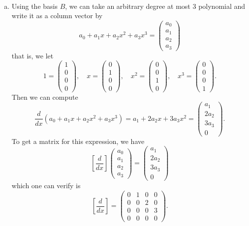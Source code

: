 \documentclass[12pt]{article} %
\begin{document}
\begin{solution}~
\begin{enumerate}[(a)]
\item Using the basis $B$, we can take an arbitrary degree at most 3 polynomial and write it as a column vector by
\[
a_0 + a_1 x + a_2x^2 + a_3x^3 = \begin{pmatrix} a_0 \\ a_1 \\ a_2 \\ a_3 \end{pmatrix}
\]
that is, we let
\[
1 = \begin{pmatrix} 1 \\ 0 \\ 0 \\ 0 \end{pmatrix},\quad x = \begin{pmatrix} 0 \\ 1 \\ 0 \\ 0 \end{pmatrix},\quad x^2 = \begin{pmatrix} 0 \\ 0 \\ 1 \\ 0 \end{pmatrix},\quad x^3 = \begin{pmatrix} 0 \\ 0 \\ 0 \\ 1 \end{pmatrix}.
\]
Then we can compute
\[
\frac{d}{dx} (a_0 + a_1 x + a_2x^2 + a_3x^3) = a_1 + 2a_2 x + 3a_3 x^2 = \begin{pmatrix} a_1 \\ 2a_2 \\ 3a_3 \\ 0 \end{pmatrix}.
\]
To get a matrix for this expression, we have
\[
\left[ \frac{d}{dx}\right] \begin{pmatrix} a_0 \\ a_1 \\ a_2 \\ a_3 \end{pmatrix} = \begin{pmatrix} a_1 \\ 2a_2 \\ 3a_3 \\ 0 \end{pmatrix}
\]
which one can verify is
\[
\left[ \frac{d}{dx}\right] = \begin{pmatrix} 0 & 1 & 0 & 0 \\ 0 & 0 & 2 & 0 \\ 0 & 0 & 0 & 3 \\ 0 & 0 & 0 & 0 \end{pmatrix}.
\]
\end{enumerate}
\end{solution}
\end{document}
